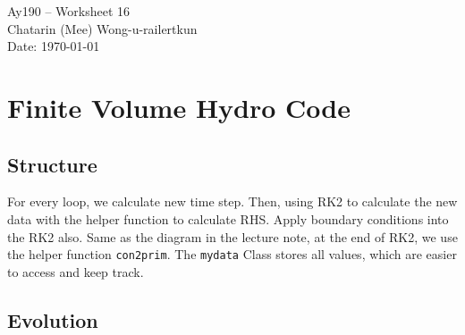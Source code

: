 \documentclass[11pt,letterpaper]{article}
\begin{document}
\begin{center}
\Large
Ay190 -- Worksheet 16 \\    %
Chatarin (Mee) Wong-u-railertkun\\
Date: \today
\end{center}

\section{Finite Volume Hydro Code}

\subsection{Structure}

For every loop, we calculate new time step. Then, using RK2 to calculate the new data with the helper function to calculate RHS. Apply boundary conditions into the RK2 also. Same as the diagram in the lecture note, at the end of RK2, we use the helper function \texttt{con2prim}. The \texttt{mydata} Class stores all values, which are easier to access and keep track. 

\subsection{Evolution}
	
\end{document}
